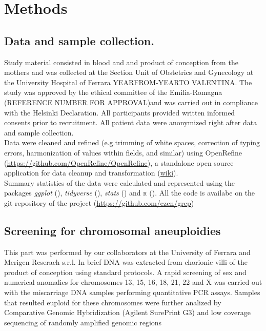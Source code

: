 \chapter{Methods}

\section{Data and sample collection.} Study material consisted in blood and and product of conception from the mothers and was collected at the Section Unit of Obstetrics and Gynecology at the University Hospital of Ferrara YEARFROM-YEARTO VALENTINA. The study was approved by the ethical committee of the Emilia-Romagna (REFERENCE NUMBER  FOR APPROVAL)and was carried out in compliance with the Helsinki Declaration. All participants provided written informed consents prior to recruitment. All patient data were anonymized right after data and sample collection.\\ 

Data were cleaned and refined (e.g.trimming of white spaces, correction of typing errors, harmonization of values within fields, and similar) using OpenRefine (\url{https://github.com/OpenRefine/OpenRefine}), a standalone open source application for data cleanup and transformation (\href{https://en.wikipedia.org/wiki/OpenRefine}{wiki}).\\

Summary statistics of the data were calculated and represented using the packages \textit{ggplot} (\cite{ggplot2}), \textit{tidyverse} (\cite{wickham2019welcome}), \textit{stats} (\cite{statsR}) and \textsc{r} (\cite{R}). All the code is availabe on the git repository of the project (\url{https://github.com/ezcn/grep}) 

\section{Screening for chromosomal aneuploidies}

This part was performed by our collaborators at the University of Ferrara and Merigen Reserach s.r.l. In brief DNA was extracted from chorionic villi of the product of conception using standard protocols. A rapid screening of sex and numerical anomalies for chromosomes 13, 15, 16, 18, 21, 22 and X was carried out with the miscarriage DNA samples performing quantitative PCR assays. Samples that resulted euploid for these chromosomes were further analized by Comparative Genomic Hybridization (Agilent SurePrint G3) and low coverage sequencing of randomly amplified genomic regions


